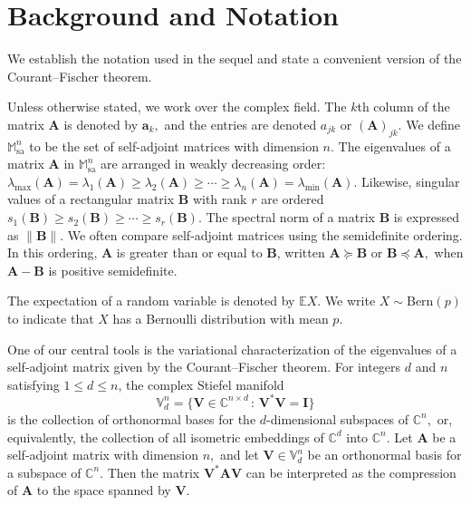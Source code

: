 \documentclass[11pt,letterpaper,twoside,reqno,nosumlimits]{amsart}
\renewcommand{\star}{*}
\newcommand{\mat}[1]{\ensuremath{\bm{#1}}} %
\newcommand{\E}{\ensuremath{\mathbb{E}}}
\newcommand{\C}{\ensuremath{\mathbb{C}}}
\newcommand{\s}{s} %
\newcommand{\snorm}[1]{\ensuremath{\|#1\|}}
\newcommand{\lambdamax}[1]{\ensuremath{\lambda_{\mathrm{max}}\left(#1\right)}}
\newcommand{\lambdamin}[1]{\ensuremath{\lambda_{\mathrm{min}}\left(#1\right)}}
\newcommand{\Isom}[2]{\ensuremath{\mathbb{V}_{#1}^{#2}}}
\newcommand{\samats}[1]{\ensuremath{\mathbb{M}^{#1}_{\mathrm{sa}}}}
\theoremstyle{remark}
\numberwithin{equation}{section}
\numberwithin{thm}{section}
\numberwithin{prop}{section}
\numberwithin{defn}{section}
\numberwithin{remark}{section}
\begin{document}
\section{Background and Notation}
\label{sec:background}
We establish the notation used in the sequel and state a convenient version of the Courant--Fischer theorem.

Unless otherwise stated, we work over the complex field. The $k$th column of the matrix $\mat{A}$ is denoted by $\mat{a}_k,$ and the entries are denoted $a_{jk}$ or $(\mat{A})_{jk}.$ We define $\samats{n}$ to be the set of self-adjoint matrices with dimension $n.$ The eigenvalues of a matrix $\mat{A}$ in $\samats{n}$ are arranged in weakly decreasing order: $\lambdamax{\mat{A}} = \lambda_1(\mat{A}) \geq \lambda_2(\mat{A}) \geq \cdots \geq \lambda_n(\mat{A}) = \lambdamin{\mat{A}}.$ Likewise, singular values of a rectangular matrix $\mat{B}$ with rank $r$ are ordered $\s_1(\mat{B}) \geq \s_2(\mat{B}) \geq \cdots \geq \s_r(\mat{B}).$ The spectral norm of a matrix $\mat{B}$ is expressed as $\snorm{\mat{B}}.$ We often compare self-adjoint matrices using the semidefinite ordering. In this ordering, $\mat{A}$ is greater than or equal to $\mat{B}$, written $\mat{A} \succeq \mat{B}$ or $\mat{B} \preceq \mat{A},$ when $\mat{A} - \mat{B}$ is positive semidefinite.

The expectation of a random variable is denoted by $\E X.$ We write $X \sim \text{Bern}(p)$ to indicate that $X$ has a Bernoulli distribution with mean $p.$

One of our central tools is the variational characterization of the eigenvalues of a self-adjoint matrix given by the Courant--Fischer theorem. 
For integers $d$ and $n$ satisfying $1 \leq d \leq n$, the complex Stiefel manifold 
\[
\Isom{d}{n} = \{\mat{V} \in \C^{n \times d} \,:\, \mat{V}^\star \mat{V} = \mathbf{I} \}
\]
is the collection of orthonormal bases for the $d$-dimensional subspaces of $\C^n,$ or, equivalently, the collection of all isometric embeddings of $\C^d$ into $\C^n.$ Let $\mat{A}$ be a self-adjoint matrix with dimension $n,$ and let $\mat{V} \in \Isom{d}{n}$ be an orthonormal basis for a subspace of $\C^n.$ Then the matrix $\mat{V}^\star \mat{A} \mat{V}$ can be interpreted as the compression of $\mat{A}$ to the space spanned by $\mat{V}.$
\end{document}
